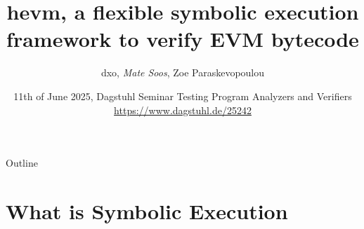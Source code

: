\documentclass[aspectratio=169]{beamer}
\title[hevm]{
hevm, a flexible symbolic execution framework to verify EVM bytecode}
\author[dxo, Soos, Paraskevopoulou]{dxo, \emph{Mate Soos}, Zoe Paraskevopoulou}
\institute[Argot]{\large Argot Collective (\url{https://argot.org})}
\date{11th of June 2025, Dagstuhl Seminar
Testing Program Analyzers and Verifiers \url{https://www.dagstuhl.de/25242}}
\begin{document}
\begin{frame}
    \titlepage 
\end{frame}

%

\begin{frame}{Outline}
    \tableofcontents
\end{frame}

\section{What is Symbolic Execution}


\end{document}
